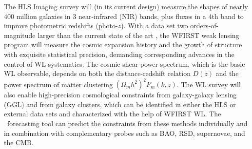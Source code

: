 %
%

The HLS Imaging survey will (in its current design) measure the shapes of
nearly 400 million galaxies in 3 near-infrared (NIR) bands, plus fluxes in a 4th band
to improve photometric redshifts (photo-$z$).  With a data set two orders-of-magnitude
larger than the current state of the art \cite{2012MNRAS.427..146H,Becker2015},
the WFIRST weak lensing program will
measure the cosmic expansion history and the growth of structure with
exquisite statistical precision, demanding corresponding advances in the
control of WL systematics.  The cosmic shear power spectrum, which is the
basic WL observable, depends on both the distance-redshift relation $D(z)$
and the power spectrum of matter clustering $(\Omega_m h^2)^2 P_m(k,z)$.
The WL survey will also enable high-precision cosmological constraints
from galaxy-galaxy lensing (GGL) and from galaxy clusters, which can be
identified in either the HLS or external data sets and characterized with
the help of WFIRST WL.  The \CoLi\ forecasting tool can predict the constraints
from these methods individually and in combination with complementary
probes such as BAO, RSD, supernovae, and the CMB.





